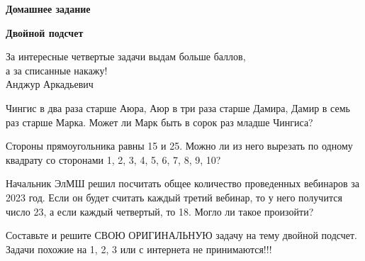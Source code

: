 \centerline{\Huge \bf  Домашнее задание }
\centerline{\Huge \bf Двойной подсчет}

\begin{flushright}
    \scriptsize{За интересные четвертые задачи выдам больше баллов,\\а за списанные накажу! \\Анджур Аркадьевич}
\end{flushright}

 Чингис в два раза старше Аюра, Аюр в три раза старше Дамира, Дамир в семь раз старше Марка. Может ли Марк быть в сорок раз младше Чингиса?

 Стороны прямоугольника равны 15 и 25. Можно ли из него вырезать по одному квадрату со сторонами 1, 2, 3, 4, 5, 6, 7, 8, 9, 10?

 Начальник ЭлМШ решил посчитать общее количество проведенных вебинаров за 2023 год. Если он будет считать каждый третий вебинар, то у него получится число 23, а если каждый четвертый, то 18. Могло ли такое произойти?

 Составьте и решите СВОЮ ОРИГИНАЛЬНУЮ задачу на тему двойной подсчет.
Задачи похожие на 1, 2, 3 или с интернета не принимаются!!!